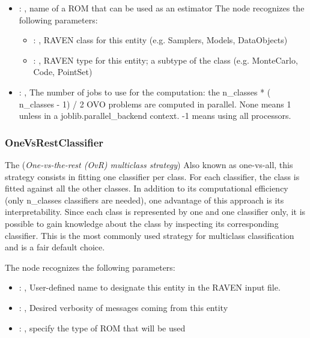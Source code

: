 \begin{itemize}
    \item {}: , 
      name of a ROM that can be used as an estimator
      The  node recognizes the following parameters:
        \begin{itemize}
          \item {}: , 
            RAVEN class for this entity (e.g. Samplers, Models, DataObjects)
          \item {}: , 
            RAVEN type for this entity; a subtype of the class (e.g. MonteCarlo, Code, PointSet)
      \end{itemize}

    \item {}: , 
      The number of jobs to use for the computation: the n\_classes * ( n\_classes - 1) / 2 OVO
      problems are computed in parallel. None means 1 unless in a joblib.parallel\_backend
      context. -1 means using all processors.
  \end{itemize}


\subsubsection{OneVsRestClassifier}
  The  (\textit{One-vs-the-rest (OvR) multiclass strategy})
  Also known as one-vs-all, this strategy consists in fitting one classifier per class. For each
  classifier, the class is fitted against all the other classes. In addition to its computational
  efficiency (only n\_classes classifiers are needed), one advantage of this approach is its
  interpretability. Since each class is represented by one and one classifier only, it is
  possible to gain knowledge about the class by inspecting its corresponding classifier.
  This is the most commonly used strategy for multiclass classification and is a fair default
  choice.                         

  The  node recognizes the following parameters:
    \begin{itemize}
      \item {}: , 
        User-defined name to designate this entity in the RAVEN input file.
      \item {}: , 
        Desired verbosity of messages coming from this entity
      \item {}: , 
        specify the type of ROM that will be used
  \end{itemize}

